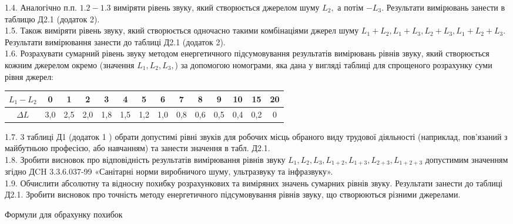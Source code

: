 \documentclass[a4paper,14pt]{extreport}
\begin{document}
1.4. Аналогічно п.п. $1.2-1.3$ виміряти рівень звуку, який створюється
джерелом шуму $L_{2},$ а потім $-L_{3} .$ Результати вимірювань занести в таблицю Д2.1 (додаток 2). \\

1.5. Також виміряти рівень звуку, який створюється одночасно такими комбінаціями джерел шуму $L_{1}+L_{2}, L_{1}+L_{3}, L_{2}+L_{3}, L_{1}+L_{2}+L_{3} .$ Результати вимірювання занести до таблиці Д2.1 (додаток 2).\\

1.6. Розрахувати сумарний рівень звуку методом енергетичного підсумовування результатів вимірювань рівнів звуку, який створюється кожним джерелом окремо (значення $L_{1}, L_{2}, L_{3},$) за допомогою номограми, яка дана у вигляді таблиці для спрощеного розрахунку суми рівня джерел:
\vspace{1cm}

\begin{tabular}{|c|c|c|c|c|c|c|c|c|c|c|c|c|c|}
\hline$L_{1}-L_{2}$ & 0 & 1 & 2 & 3 & 4 & 5 & 6 & 7 & 8 & 9 & 10 & 15 & 20 \\
\hline$\Delta L$ & 3,0 & 2,5 & 2,0 & 1,8 & 1,5 & 1,2 & 1,0 & 0,8 & 0,6 & 0,5 & 0,4 & 0,2 & 0 \\
\hline
\end{tabular}
\vspace{1cm}

1.7. 3 таблиці Д1 (додаток 1 ) обрати допустимі рівні звуків для робочих місць обраного виду трудової діяльності (наприклад, пов'язаний з майбутньою професією, або навчанням) та занести значення в табл. Д2.1.\\

1.8. Зробити висновок про відповідність результатів вимірювання рівнів звуку $L_{1}, L_{2}, L_{3}, L_{1+2}, L_{1+3}, L_{2+3}, L_{1+2+3}$ допустимим значенням згідно $Д \mathrm{CH}$ 3.3.6.037-99 «Санітарні норми виробничого шуму, ультразвуку та інфразвуку».\\

1.9. Обчислити абсолютну та відносну похибку розрахункових та виміряних значень сумарних рівнів звуку. Результати занести до таблиці Д2.1. Зробити висновок про точність методу енергетичного підсумовування рівнів звуку, що створюються різними джерелами.








\begin{center}
  Формули для обрахунку похибок
\end{center}
\end{document}
